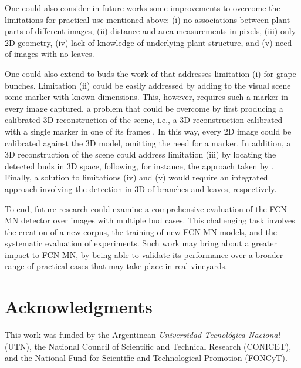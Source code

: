 \documentclass[a4paper,authoryear,review]{elsarticle}
\begin{document}
	One could also consider in future works some improvements to overcome the limitations for practical use mentioned above: (i) no associations between plant parts of different images, (ii) distance and area measurements in pixels, (iii) only 2D geometry, (iv) lack of knowledge of underlying plant structure, and (v) need of images with no leaves. 
	
	One could also extend to buds the work of \citet{santos2020grape} that addresses limitation (i) for grape bunches. Limitation (ii) could be easily addressed by adding to the visual scene some marker with known dimensions. This, however, requires such a marker in every image captured, a problem that could be overcome by first producing a calibrated 3D reconstruction of the scene, i.e., a 3D reconstruction calibrated with a single marker in one of its frames \citep{hartley2003multiple, moons20093d}. In this way, every 2D image could be calibrated against the 3D model, omitting the need for a marker. In addition, a 3D reconstruction of the scene could address limitation (iii) by locating the detected buds in 3D space, following, for instance, the approach taken by \citet{diaz2018grapevine}. Finally, a solution to limitations (iv) and (v) would require an integrated approach involving the detection in 3D of branches and leaves, respectively. 
	
	To end, future research could examine a comprehensive evaluation of the FCN-MN detector over images with multiple bud cases. This challenging task involves the creation of a new corpus, the training of new FCN-MN models, and the systematic evaluation of experiments. Such work may bring about a greater impact to FCN-MN, by being able to validate its performance over a broader range of practical cases that may take place in real vineyards.
	
	\section*{Acknowledgments}
	
	This work was funded by the Argentinean \emph{Universidad Tecnológica Nacional} (UTN), the National Council of Scientific and Technical Research (CONICET), and the National Fund for Scientific and Technological Promotion (FONCyT).
	
	
	
\end{document}
